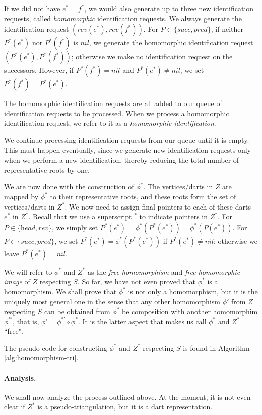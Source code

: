 \documentclass[10pt,a4paper]{article}
\def\nil{\textit{nil}}
\def\head{\textit{head}}
\def\reverse{\textit{rev}}
\def\successor{\textit{succ}}
\def\predecessor{\textit{pred}}
\begin{document}
If we did not have $e^*=f^*$, we would also generate up to three new identification requests, called \emph{homomorphic} identification requests. We always generate the identification request
$(\reverse(e^*),\reverse(f^*))$.
For $P\in\{\successor,\predecessor\}$, if neither $P^*(e^*)$ nor $P^*(f^*)$ is $\nil$, we generate the homomorphic identification request $(P^*(e^*),P^*(f^*))$; otherwise we make no identification request on the successors. However, if $P^*(f^*)=\nil$ and $P^*(e^*)\neq\nil$, we set $P^*(f^*)=P^*(e^*)$. 

The homomorphic identification requests are all added to our queue of identification requests to be processed. When we process a homomorphic identification request, we refer to it as a \emph{homomorphic identification}.



We continue processing identification requests from our queue until it is empty.  This must happen eventually, since we generate new identification requests only when we perform a new identification, thereby reducing the total number of representative roots by one.

We are now done with the construction of $\phi^*$.
The vertices/darts in $Z$ are mapped by $\phi^*$ to their representative roots, and these roots
form the set of vertices/darts in $Z^*$. We now need to assign final pointers to each of these darts $e^*$ in $Z^*$. Recall that we use a superscript $^*$ to indicate pointers in $Z^*$. 
For $P\in\{\head,\reverse\}$,
we simply set $P^*(e^*)=\phi^*(P^*(e^*))=\phi^*(P(e^*))$.
For $P\in\{\successor,\predecessor\}$,
we set $P^*(e^*)=\phi^*(P^*(e^*))$ if $P^*(e^*)\neq\nil$; otherwise we leave
$P^*(e^*)=\nil$.


We will refer to $\phi^*$ and $Z^*$ as the \emph{free homomorphism} and \emph{free homomorphic image} of $Z$ respecting $S$. So far, we have not even proved that $\phi^*$ is a homomorphism. We shall prove that $\phi^*$ is not only a homomorphism, but it is the uniquely most general one in the sense that any other homomorphism $\phi'$ from $Z$ respecting $S$ can be obtained from $\phi^*$ be composition with another homomorphim $\phi^{*\prime}$, that is,  $\phi'=\phi^{*\prime}\circ \phi^*$. 
It is the latter aspect that makes us call $\phi^*$ and $Z^*$ ``free".



The pseudo-code for constructing $\phi^*$ and $Z^*$ respecting $S$ is found in Algorithm \ref{alg:homomorphism-tri}.

\paragraph{Analysis.}
We shall now analyze the process outlined above. At the moment, it is not even clear if
$Z^*$ is a pseudo-triangulation, but it is a dart representation.
\end{document}
